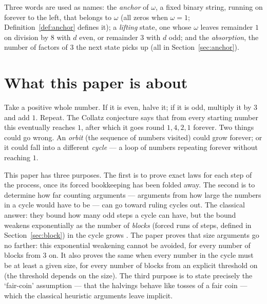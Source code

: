 \documentclass[11pt]{article}
\theoremstyle{remark}
\newcommand{\w}{\omega}
\begin{document}
Three words are used as names: the \emph{anchor} of $\w$, a fixed binary string, running on forever to the left, that belongs to $\w$ (all zeros when $\w = 1$; Definition~\ref{def:anchor} defines it); a \emph{lifting} state, one whose $\w$ leaves remainder $1$ on division by $8$ with $d$ even, or remainder $3$ with $d$ odd; and the \emph{absorption}, the number of factors of $3$ the next state picks up (all in Section~\ref{sec:anchor}).

\section{What this paper is about}\label{sec:intro}

Take a positive whole number. If it is even, halve it; if it is odd, multiply it by $3$ and add $1$. Repeat. The Collatz conjecture says that from every starting number this eventually reaches $1$, after which it goes round $1, 4, 2, 1$ forever. Two things could go wrong. An \emph{orbit} (the sequence of numbers visited) could grow forever; or it could fall into a different \emph{cycle} --- a loop of numbers repeating forever without reaching $1$.

This paper has three purposes. The first is to prove exact laws for each step of the process, once its forced bookkeeping has been folded away. The second is to determine how far counting arguments --- arguments from how large the numbers in a cycle would have to be --- can go toward ruling cycles out. The classical answer: they bound how many odd steps a cycle can have, but the bound weakens exponentially as the number of \emph{blocks} (forced runs of steps, defined in Section~\ref{sec:block}) in the cycle grows \cite{rozier91,sdw}. The paper proves that size arguments go no farther: this exponential weakening cannot be avoided, for every number of blocks from $3$ on. It also proves the same when every number in the cycle must be at least a given size, for every number of blocks from an explicit threshold on (the threshold depends on the size). The third purpose is to state precisely the `fair-coin' assumption --- that the halvings behave like tosses of a fair coin --- which the classical heuristic arguments leave implicit.
\end{document}
